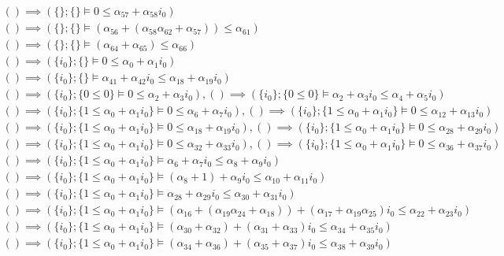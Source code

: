 {\begin{align*}
    () \implies (\{\};\{\}  \vDash 0 \leq \alpha_{57} + \alpha_{58}i_{0})\\ () \implies (\{\};\{\}  \vDash (\alpha_{56}+(\alpha_{58}\alpha_{62}+\alpha_{57})) \leq \alpha_{61})\\ () \implies (\{\};\{\}  \vDash (\alpha_{64}+\alpha_{65}) \leq \alpha_{66})\\ () \implies (\{i_{0}\};\{\}  \vDash 0 \leq \alpha_{0} + \alpha_{1}i_{0})\\ () \implies (\{i_{0}\};\{\}  \vDash \alpha_{41} + \alpha_{42}i_{0} \leq \alpha_{18} + \alpha_{19}i_{0})\\ () \implies (\{i_{0}\};\{0 \leq 0\}  \vDash 0 \leq \alpha_{2} + \alpha_{3}i_{0}), () \implies (\{i_{0}\};\{0 \leq 0\}  \vDash \alpha_{2} + \alpha_{3}i_{0} \leq \alpha_{4} + \alpha_{5}i_{0})\\ () \implies (\{i_{0}\};\{1 \leq \alpha_{0} + \alpha_{1}i_{0}\}  \vDash 0 \leq \alpha_{6} + \alpha_{7}i_{0}), () \implies (\{i_{0}\};\{1 \leq \alpha_{0} + \alpha_{1}i_{0}\}  \vDash 0 \leq \alpha_{12} + \alpha_{13}i_{0})\\ () \implies (\{i_{0}\};\{1 \leq \alpha_{0} + \alpha_{1}i_{0}\}  \vDash 0 \leq \alpha_{18} + \alpha_{19}i_{0}), () \implies (\{i_{0}\};\{1 \leq \alpha_{0} + \alpha_{1}i_{0}\}  \vDash 0 \leq \alpha_{28} + \alpha_{29}i_{0})\\ () \implies (\{i_{0}\};\{1 \leq \alpha_{0} + \alpha_{1}i_{0}\}  \vDash 0 \leq \alpha_{32} + \alpha_{33}i_{0}), () \implies (\{i_{0}\};\{1 \leq \alpha_{0} + \alpha_{1}i_{0}\}  \vDash 0 \leq \alpha_{36} + \alpha_{37}i_{0})\\ () \implies (\{i_{0}\};\{1 \leq \alpha_{0} + \alpha_{1}i_{0}\}  \vDash \alpha_{6} + \alpha_{7}i_{0} \leq \alpha_{8} + \alpha_{9}i_{0})\\ () \implies (\{i_{0}\};\{1 \leq \alpha_{0} + \alpha_{1}i_{0}\}  \vDash (\alpha_{8}+1) + \alpha_{9}i_{0} \leq \alpha_{10} + \alpha_{11}i_{0})\\ () \implies (\{i_{0}\};\{1 \leq \alpha_{0} + \alpha_{1}i_{0}\}  \vDash \alpha_{28} + \alpha_{29}i_{0} \leq \alpha_{30} + \alpha_{31}i_{0})\\ () \implies (\{i_{0}\};\{1 \leq \alpha_{0} + \alpha_{1}i_{0}\}  \vDash (\alpha_{16}+(\alpha_{19}\alpha_{24}+\alpha_{18})) + (\alpha_{17}+\alpha_{19}\alpha_{25})i_{0} \leq \alpha_{22} + \alpha_{23}i_{0})\\ () \implies (\{i_{0}\};\{1 \leq \alpha_{0} + \alpha_{1}i_{0}\}  \vDash (\alpha_{30}+\alpha_{32}) + (\alpha_{31}+\alpha_{33})i_{0} \leq \alpha_{34} + \alpha_{35}i_{0})\\ () \implies (\{i_{0}\};\{1 \leq \alpha_{0} + \alpha_{1}i_{0}\}  \vDash (\alpha_{34}+\alpha_{36}) + (\alpha_{35}+\alpha_{37})i_{0} \leq \alpha_{38} + \alpha_{39}i_{0})\\ 

\end{align*}}
